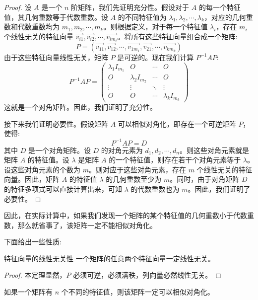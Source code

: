 \documentclass[a4paper,12pt]{ctexart}
\begin{document}
\begin{proof}
    设 $A$ 是一个 $n$ 阶矩阵，我们先证明充分性。假设对于 $A$ 的每一个特征值，其几何重数等于代数重数。设 $A$ 的不同特征值为 $\lambda_1, \lambda_2, \cdots, \lambda_k$，对应的几何重数和代数重数均为 $m_1, m_2, \cdots, m_k$。则根据定义，对于每一个特征值 $\lambda_i$，存在 $m_i$ 个线性无关的特征向量 $\vec{v_{i1}}, \vec{v_{i2}}, \cdots, \vec{v_{im_i}}$。将所有这些特征向量组合成一个矩阵:
    \[
    P = (\vec{v_{11}}, \vec{v_{12}}, \cdots, \vec{v_{1m_1}}, \vec{v_{21}}, \cdots, \vec{v_{km_k}})
    \]
    由于这些特征向量线性无关，矩阵 $P$ 是可逆的。现在我们计算 $P^{-1} A P$:
    \[
    P^{-1} A P = \begin{pmatrix}
    \lambda_1 I_{m_1} & O & \cdots & O \\
    O & \lambda_2 I_{m_2} & \cdots & O \\
    \vdots & \vdots & \ddots & \vdots \\
    O & O & \cdots & \lambda_k I_{m_k}
    \end{pmatrix}
    \]
    这就是一个对角矩阵。因此，我们证明了充分性。

    接下来我们证明必要性。假设矩阵 $A$ 可以相似对角化，即存在一个可逆矩阵 $P$，使得:
    \[
    P^{-1} A P = D
    \]
    其中 $D$ 是一个对角矩阵。设 $D$ 的对角元素为 $d_1, d_2, \cdots, d_n$。则这些对角元素就是矩阵 $A$ 的特征值。设 $\lambda$ 是矩阵 $A$ 的一个特征值，则存在若干个对角元素等于 $\lambda$。设这些对角元素的个数为 $m$。则对应于这些对角元素，存在 $m$ 个线性无关的特征向量。因此，矩阵 $A$ 的特征值 $\lambda$ 的几何重数至少为 $m$。同时，由于对角矩阵 $D$ 的特征多项式可以直接计算出来，可知 $\lambda$ 的代数重数也为 $m$。因此，我们证明了必要性。
\end{proof}

因此，在实际计算中，如果我们发现一个矩阵的某个特征值的几何重数小于代数重数，那么就省事了，该矩阵一定不能相似对角化。

下面给出一些性质:

\begin{myprop}{特征向量的线性无关性}{}
    一个矩阵的任意两个特征向量一定线性无关。
\end{myprop}
\begin{proof}
    本定理显然，$P$ 必须可逆，必须满秩，列向量必然线性无关。
\end{proof}

\begin{myprop}{}{}
    如果一个矩阵有 $n$ 个不同的特征值，则该矩阵一定可以相似对角化。
\end{myprop}
\end{document}
